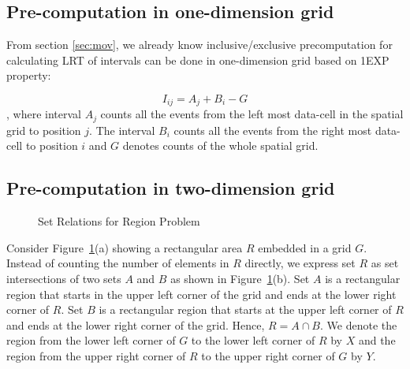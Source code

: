 \documentclass[AMA,LATO1COL]{WileyNJD-v2}
\begin{document}
\subsection{Pre-computation in one-dimension grid}
From section \ref{sec:mov}, we already know inclusive/exclusive precomputation for calculating LRT of intervals can be done in one-dimension grid based on 1EXP property:

\begin{equation}
I_{ij} = A_j + B_i - G
\end{equation},
where interval $A_j$ counts all the events from the left most data-cell in
the spatial grid to position $j$. The interval $B_i$ counts all the events from the right most
data-cell to position $i$ and $G $ denotes counts of the whole spatial
grid.
\subsection{Pre-computation in two-dimension grid}
\begin{figure}[h]
     \begin{center}
\end{center}
\vspace{-10pt}
\caption{Set Relations for Region Problem}\label{fig:example}
\end{figure}



Consider Figure~\ref{fig:example}(a) showing a rectangular area $R$
embedded in a grid $G$. Instead of counting the number of elements in
$R$ directly, we express set $R$ as set intersections of two sets $A$
and $B$ as shown in Figure~\ref{fig:example}(b). Set $A$ is a
rectangular region that starts in the upper left corner of the grid
and ends at the lower right corner of $R$. Set $B$ is a rectangular
region that starts at the upper left corner of $R$ and ends at the
lower right corner of the grid. Hence, $R=A \cap B$. We denote the
region from the lower left corner of $G$ to the lower left corner of
$R$ by $X$ and the region from the upper right corner of $R$ to the
upper right corner of $G$ by $Y$.
\end{document}
